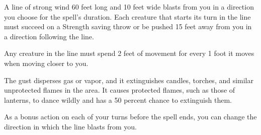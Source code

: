 A line of strong wind 60 feet long and 10 feet wide blasts from you in a direction you choose for the spell's duration. Each creature that starts its turn in the line must succeed on a Strength saving throw or be pushed 15 feet away from you in a direction following the line.

Any creature in the line must spend 2 feet of movement for every 1 foot it moves when moving closer to you.

The gust disperses gas or vapor, and it extinguishes candles, torches, and similar unprotected flames in the area. It causes protected flames, such as those of lanterns, to dance wildly and has a 50 percent chance to extinguish them.

As a bonus action on each of your turns before the spell ends, you can change the direction in which the line blasts from you.
